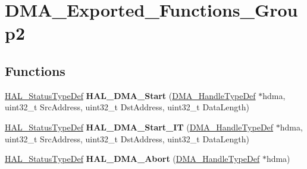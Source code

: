 \hypertarget{group___d_m_a___exported___functions___group2}{}\section{D\+M\+A\+\_\+\+Exported\+\_\+\+Functions\+\_\+\+Group2}
\label{group___d_m_a___exported___functions___group2}
\subsection*{Functions}
\begin{DoxyCompactItemize}
\item 
\mbox{\label{group___d_m_a___exported___functions___group2_ga96fbd9c285135f558fd9283a57406330}} 
\hyperlink{stm32f0xx__hal__def_8h_a63c0679d1cb8b8c684fbb0632743478f}{H\+A\+L\+\_\+\+Status\+Type\+Def} {\bfseries H\+A\+L\+\_\+\+D\+M\+A\+\_\+\+Start} (\hyperlink{group___d_m_a___exported___types_ga92b907d56a9c29b93d46782a7a04f91e}{D\+M\+A\+\_\+\+Handle\+Type\+Def} $\ast$hdma, uint32\+\_\+t Src\+Address, uint32\+\_\+t Dst\+Address, uint32\+\_\+t Data\+Length)
\item 
\mbox{\label{group___d_m_a___exported___functions___group2_ga7eddc0931ac8a3d77b23d6d5e68407c7}} 
\hyperlink{stm32f0xx__hal__def_8h_a63c0679d1cb8b8c684fbb0632743478f}{H\+A\+L\+\_\+\+Status\+Type\+Def} {\bfseries H\+A\+L\+\_\+\+D\+M\+A\+\_\+\+Start\+\_\+\+IT} (\hyperlink{group___d_m_a___exported___types_ga92b907d56a9c29b93d46782a7a04f91e}{D\+M\+A\+\_\+\+Handle\+Type\+Def} $\ast$hdma, uint32\+\_\+t Src\+Address, uint32\+\_\+t Dst\+Address, uint32\+\_\+t Data\+Length)
\item 
\mbox{\label{group___d_m_a___exported___functions___group2_ga001f9fb04328a7460f9ff16908ff987c}} 
\hyperlink{stm32f0xx__hal__def_8h_a63c0679d1cb8b8c684fbb0632743478f}{H\+A\+L\+\_\+\+Status\+Type\+Def} {\bfseries H\+A\+L\+\_\+\+D\+M\+A\+\_\+\+Abort} (\hyperlink{group___d_m_a___exported___types_ga92b907d56a9c29b93d46782a7a04f91e}{D\+M\+A\+\_\+\+Handle\+Type\+Def} $\ast$hdma)
\item 
\mbox{\label{group___d_m_a___exported___functions___group2_ga6677d7e614747341a58ffd7a048fd390}} 

\end{DoxyCompactItemize}
